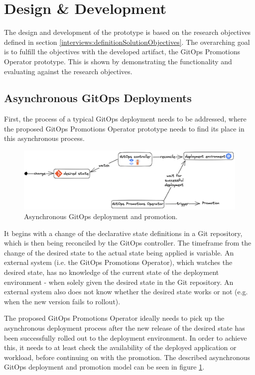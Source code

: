 \section{Design \& Development}

The design and development of the prototype
is based on the research objectives defined in section
\ref{interviews:definitionSolutionObjectives}.
The overarching goal is to fulfill the objectives with the developed artifact,
the GitOps Promotions Operator prototype.
This is shown by demonstrating the functionality and evaluating against the research objectives.

\subsection{Asynchronous GitOps Deployments}
\label{prototype:design:async-gitops-deployments}

First, the process of a typical GitOps deployment needs to be addressed, where
the proposed GitOps Promotions Operator prototype needs to find its place in this asynchronous process.

\begin{figure}[h]
	\centering
	\includegraphics[width=1.00\linewidth]{assets/async-gitops-promo-arch.png}
	\caption{Asynchronous GitOps deployment and promotion.
	}
	\label{fig:async-gitops-promo-arch}	
\end{figure}

It begins with a change of the declarative state definitions in a Git repository,
which is then being reconciled by the GitOps controller.
The timeframe from the change of the desired state to the actual state being applied
is variable. An external system (i.e. the GitOps Promotions Operator), which watches the desired state, has no knowledge of
the current state of the deployment environment - when solely given the desired state in the
Git repository. An external system also does not know whether the desired state works or not
(e.g. when the new version fails to rollout).

The proposed GitOps Promotions Operator ideally needs to pick up
the asynchronous deployment process after the new release of the desired state
has been successfully rolled out to the deployment environment.
In order to achieve this,
it needs to at least check the availability of the deployed application or workload,
before continuing on with the promotion.
The described asynchronous GitOps deployment and promotion model can be seen in figure
\ref{fig:async-gitops-promo-arch}.


